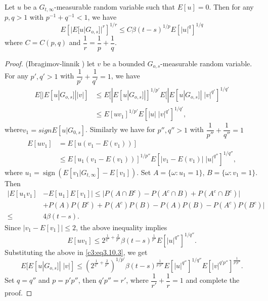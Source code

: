 \begin{Lemma}\label{c3:lem3.10.1} %
  Let $u$ be a $G_{t, \infty}$-measurable random variable such that
  $E[u]=0$. Then for any $p,q>1$ with $p^{-1}+q^{-1}<1$, we have 
  \begin{equation*}
    E\left[|E[u|G_{o,s}]|^r\right]^{1/r} \le C \beta
    (t-s)^{1/p}E[|u|^q]^{1/q} \tag{3.10.2}\label{c3:eq3.10.2} 
  \end{equation*}
  where $C=C(p,q)$ and $\dfrac{1}{r}=\dfrac{1}{p}+\dfrac{1}{q}$.
\end{Lemma}

\begin{proof}
  (Ibragimov-linnik \cite{11}) let $v$ be a bounded $G_{o,s}$-measurable
  random variable. For any $p',q' >1$ with
  $\dfrac{1}{p'}+\dfrac{1}{q'}=1$, we have 
  \begin{align*}
    E[|E[u|G_{o,s}]||v|] & \le E[|E[u|G_{o,s}]|]^{1/p'}
    E[|E[u|G_{o,s}]| \; |v|^{q'}]^{1/q'}\\ 
    & \le E[uv_1]^{1/ p'} E [|u| \; |v|^{q'}]^{1/q'}, \tag{3.10.3}\label{c3:eq3.10.3}
  \end{align*}
  where\pageoriginale $v_1 = sign E[u|G_{0,s}]$. Similarly we have for $p'',q'' >1$ with
  $\dfrac{1}{p''}+ \dfrac{1}{q''} = 1$  
  \begin{align*}
    E[u v_1] & = E[u(v_1 - E(v_1))]\\
    &\le E[u_1(v_1 - E (v_1))]^{1/p''} E[|v_1 - E(v_1)| \; |u|^{q''}]^{1/q''},
  \end{align*}
  where $u_1 = ~\text{sign}~ (E[v_1|G_{t,\infty}] - E[v_1])$.  Set $A = \{ \omega:
  u_1 = 1\}$, $B = \{ \omega:v_1=1 \}$. Then  
  \begin{align*}
  |E[u_1v_1]& -E[u_1]E[v_1]|  \le |P (A\cap B^c)-P(A^c \cap B)+P(A^c
  \cap B^c)|\\ 
    &+ P(A)P(B^c)+P(A^c)P(B)-P(A)P(B)-P(A^c)P(B^c)|\\
    \le \quad & 4\beta (t-s).
  \end{align*}
  Since $|v_1 - E[v_1] | \le 2$, the above inequality implies
  $$
  E [uv_1] \leq 2^{\frac{1}{q''} + \frac{2}{p''}}
  \beta(t-s)^{\frac{1}{p''}} E [|u|^{q''}]^{1/q''}. 
  $$
  Substituting the above in \eqref{c3:eq3.10.3}, we get
  $$
  E[E[u|G_{o,s}]| \; |v|] \le (2^{\frac{1}{q''}+\frac{2}{p''}})^{1/p'} \beta
  (t-s)^{\frac{1}{p'p''}} E[|u|^{q''}]^{1/ q''}
  E[|v|^{q'p''}]^{\frac{1}{p'p''}}. 
  $$
  Set $q=q''$ and $p=p' p''$, then $q'p''=r'$, where
  $\dfrac{1}{r'} + \dfrac{1}{r}=1$ and complete the proof. 
\end{proof}
   
